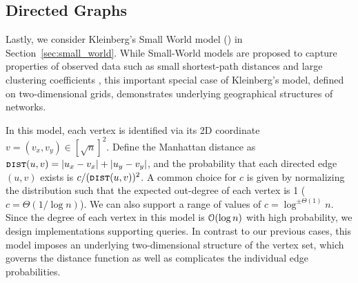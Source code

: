 \subsection{Directed Graphs}
\label{sec:directed_graphs}
Lastly, we consider Kleinberg's Small World model (\cite{kleinberg, klein}) in Section~\ref{sec:small_world}.
While Small-World models are proposed to capture properties of observed data such as small shortest-path 
distances and large clustering coefficients \cite{watts1998collective}, 
this important special case of Kleinberg's model, defined on two-dimensional grids, demonstrates underlying geographical structures of networks.

In this model, each vertex is identified via its 2D coordinate $v = (v_x, v_y) \in [\sqrt{n}]^2$.
Define the Manhattan distance as $\texttt{\textsc{dist}}(u,v)=|u_x-v_x|+|u_y-v_y|$,
and the probability that each directed edge $(u,v)$ exists is $c/(\texttt{\textsc{dist}}(u,v))^{2}$.
A common choice for $c$ is given by normalizing the distribution such that the expected out-degree of each vertex is 1 ($c = \Theta(1/\log n)$).
We can also support a range of values of $c=\log^{\pm\Theta(1)}n$.
Since the degree of each vertex in this model is $\Bo(\log n)$ with high probability, we design implementations supporting  queries.
In contrast to our previous cases, this model imposes an underlying two-dimensional structure of the vertex set,
which governs the distance function as well as complicates the individual edge probabilities.
